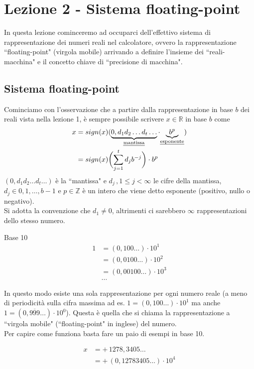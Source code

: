\section{Lezione 2 - Sistema floating-point}
In questa lezione cominceremo ad occuparci dell'effettivo sistema di rappresentazione dei numeri reali nel calcolatore, ovvero la rappresentazione ``floating-point" (virgola mobile) arrivando a definire l'insieme dei ``reali-macchina" e il concetto chiave di ``precisione di macchina".

\subsection{Sistema floating-point}
Cominciamo con l'osservazione che a partire dalla rappresentazione in base $b$ dei reali vista nella lezione 1, è sempre possibile scrivere $x \in \mathbb{R}$ in base $b$ come 
\[ \begin{split}
    x & = sign(x)( \underbrace{0,d_1 d_2 \dotsc d_t \dotsc}_{\text {\uline{mantissa}}} \cdot {\underbrace{b^p}_{\text{\uline{esponente}}}}) \\
    & = sign(x)\biggl( \sum_{j=1}^t d_j b^{-j} \biggr) \cdot b^p
\end{split} \]
$(0,d_1 d_2 \dotsc d_t \dotsc)$ è la ``mantissa" e $d_j\, , 1 \le j < \infty$ le cifre della mantissa, $d_j \in {0, 1, \dotsc , b-1}$ e $p \in \mathbb{Z}$ è un intero che viene detto esponente (positivo, nullo o negativo). \\
Si adotta la convenzione che $d_1 \ne 0$, altrimenti ci sarebbero $\infty$ rappresentazioni dello stesso numero.
\begin{esempio}
Base 10
\[ \begin{split}
    1 & = (0,100 \dotsc) \cdot 10^1 \\
    & = (0,0100 \dotsc) \cdot 10^2 \\
    & = (0,00100 \dotsc) \cdot 10^3 \\
    & \dotsc
\end{split}\]
\end{esempio}
In questo modo esiste una sola rappresentazione per ogni numero reale (a meno di periodicità sulla cifra massima ad es. $1 = (0,100 \dotsc) \cdot 10^1$ ma anche $1 = (0,\overline{999} \dotsc) \cdot 10^0$). Questa è quella che si chiama la rappresentazione a ``virgola mobile" (``floating-point" in inglese) del numero. \\
Per capire come funziona basta fare un paio di esempi in base 10.
\begin{esempio}
\[\begin{split}
    x & = + \, 1278,3405 \dotsc \\
    & = + \, (0,12783405 \dotsc) \cdot 10^4 
\end{split}\]
\end{esempio}

